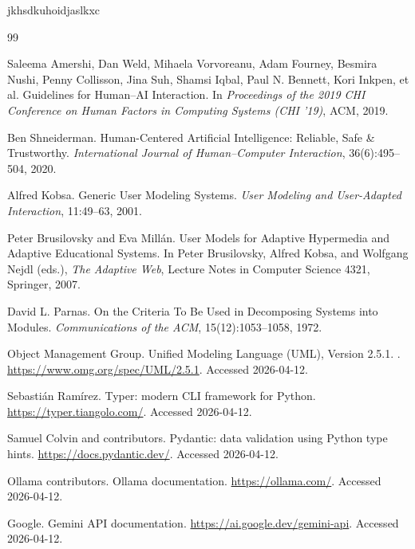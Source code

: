 \documentclass[12pt,a4paper]{article}
\begin{document}
jkhsdkuhoidjaslkxc

\begin{thebibliography}{99}

Saleema Amershi, Dan Weld, Mihaela Vorvoreanu, Adam Fourney, Besmira Nushi, Penny Collisson, Jina Suh, Shamsi Iqbal,
Paul N. Bennett, Kori Inkpen, et al.
\newblock Guidelines for Human--AI Interaction.
\newblock In \emph{Proceedings of the 2019 CHI Conference on Human Factors in Computing Systems (CHI '19)}, ACM, 2019.

Ben Shneiderman.
\newblock Human-Centered Artificial Intelligence: Reliable, Safe \& Trustworthy.
\newblock \emph{International Journal of Human--Computer Interaction}, 36(6):495--504, 2020.

Alfred Kobsa.
\newblock Generic User Modeling Systems.
\newblock \emph{User Modeling and User-Adapted Interaction}, 11:49--63, 2001.

Peter Brusilovsky and Eva Mill{\'a}n.
\newblock User Models for Adaptive Hypermedia and Adaptive Educational Systems.
\newblock In Peter Brusilovsky, Alfred Kobsa, and Wolfgang Nejdl (eds.), \emph{The Adaptive Web}, Lecture Notes in
Computer Science 4321, Springer, 2007.

David L. Parnas.
\newblock On the Criteria To Be Used in Decomposing Systems into Modules.
\newblock \emph{Communications of the ACM}, 15(12):1053--1058, 1972.

Object Management Group.
\newblock Unified Modeling Language (UML), Version 2.5.1.
. \url{https://www.omg.org/spec/UML/2.5.1}. Accessed 2026-04-12.

Sebasti{\'a}n Ram{\'i}rez.
\newblock Typer: modern CLI framework for Python.
\newblock \url{https://typer.tiangolo.com/}. Accessed 2026-04-12.

Samuel Colvin and contributors.
\newblock Pydantic: data validation using Python type hints.
\newblock \url{https://docs.pydantic.dev/}. Accessed 2026-04-12.

Ollama contributors.
\newblock Ollama documentation.
\newblock \url{https://ollama.com/}. Accessed 2026-04-12.

Google.
\newblock Gemini API documentation.
\newblock \url{https://ai.google.dev/gemini-api}. Accessed 2026-04-12.

\end{thebibliography}
\end{document}

